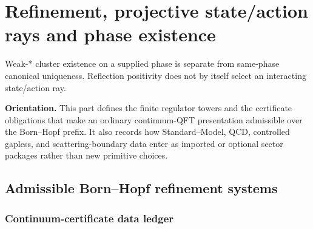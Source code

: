 \documentclass[12pt,a4paper]{article}
\begin{document}
\endgroup



\section{Refinement, projective state/action rays and phase existence}
\label{p12:sec:v237-c2}
Weak-* cluster existence on a supplied phase is separate from same-phase canonical uniqueness. Reflection positivity does not by itself select an interacting state/action ray.


\noindent\textbf{Orientation.}
This part defines the finite regulator towers and the certificate obligations that make an ordinary continuum-QFT presentation admissible over the Born--Hopf prefix.  It also records how Standard--Model, QCD, controlled gapless, and scattering-boundary data enter as imported or optional sector packages rather than new primitive choices.


\subsection{Admissible Born--Hopf refinement systems}
\label{p12:sec:admissible-refinements}


\subsubsection{Continuum-certificate data ledger}
\label{p12:sec:refinement-ledger}
\end{document}
